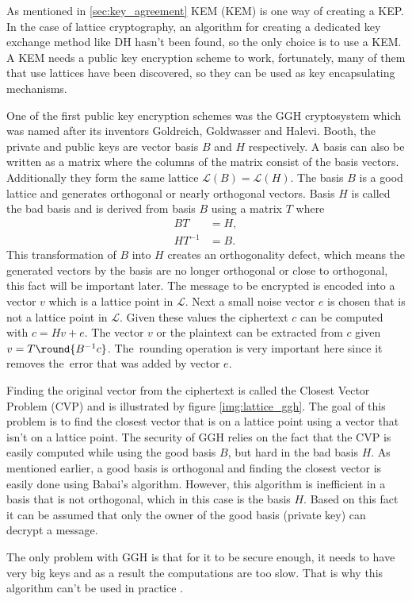 As mentioned in \ref{sec:key_agreement} KEM (\acl{KEM}) is one way of creating a KEP. In the case of lattice cryptography, an algorithm for creating a dedicated key exchange method like DH hasn't been found, so the only choice is to use a KEM. A KEM needs a public key encryption scheme to work, fortunately, many of them that use lattices have been discovered, so they can be used as key encapsulating mechanisms.

One of the first public key encryption schemes was the GGH cryptosystem which was named after its inventors Goldreich, Goldwasser and Halevi. Booth, the private and public keys are vector basis $B$ and $H$ respectively. A basis can also be written as a matrix where the columns of the matrix consist of the basis vectors. Additionally they form the same lattice $\mathcal{L}(B)=\mathcal{L}(H)$. The basis $B$ is a good lattice and generates orthogonal or nearly orthogonal vectors. Basis $H$ is called the bad basis and is derived from basis $B$ using a matrix $T$ where
\begin{equation}
  \begin{aligned}
    BT&=H, \\
    HT^{-1}&=B.
  \end{aligned}
\end{equation}
This transformation of $B$ into $H$ creates an orthogonality defect, which means the generated vectors by the basis are no longer orthogonal or close to orthogonal, this fact will be important later. The message to be encrypted is encoded into a vector $v$ which is a lattice point in $\mathcal{L}$. Next a small noise vector $e$ is chosen that is not a lattice point in $\mathcal{L}$. Given these values the ciphertext $c$ can be computed with $c = Hv + e$. The vector $v$ or the plaintext can be extracted from $c$ given $v=T \round{B^{-1}c}$. The~rounding operation is very important here since it removes the~error that was added by vector $e$. \cite{Bernstein2009}\cite{Goldreich1997}


Finding the original vector from the ciphertext is called the Closest Vector Problem (CVP) and is illustrated by figure \ref{img:lattice_ggh}. The goal of this problem is to find the closest vector that is on a lattice point using a vector that isn't on a lattice point. The security of GGH relies on the fact that the CVP is easily computed while using the good basis $B$, but hard in the bad basis $H$. As mentioned earlier, a good basis is orthogonal and finding the closest vector is easily done using Babai's algorithm. However, this algorithm is inefficient in a basis that is not orthogonal, which in this case is the basis $H$. Based on this fact it can be assumed that only the owner of the good basis (private key) can decrypt a message. \cite{Goldreich1997}

The only problem with GGH is that for it to be secure enough, it needs to have very big keys and as a result the computations are too slow. That is why this algorithm can't be used in practice \cite{Bernstein2009}.
